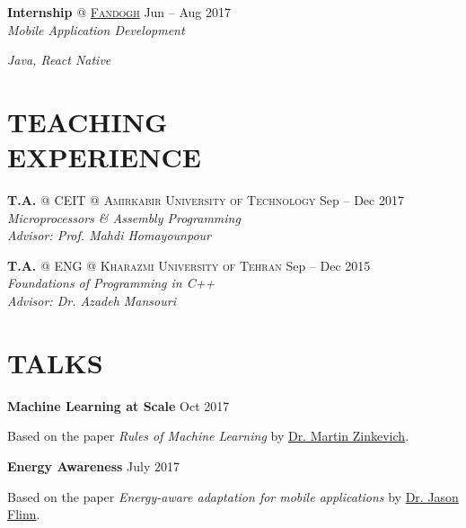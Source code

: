 \documentclass[margin, 10pt]{res} %
\begin{document}
\begin{resume}
	\textbf{Internship} \textsc{@}
	\href{http://www.fandogh.org/}{\textsc{Fandogh}}
	\hfill {Jun -- Aug 2017}\\
	\textit{Mobile Application Development}
	\begin{innerlist}
		\item \textit{Java, React Native}
	\end{innerlist}

  	\vspace{0.5cm}
    
    \section{TEACHING \\ EXPERIENCE} 
    
   \textbf{T.A.} \textsc{@}
   \textsc{CEIT} \textsc{@} \textsc{Amirkabir University of Technology}
   \hfill {Sep -- Dec 2017}\\
   \textit{Microprocessors \& Assembly Programming}\\
   \textit{Advisor: Prof. Mahdi Homayounpour}
   
   \textbf{T.A.} \textsc{@}
   \textsc{ENG} \textsc{@} \textsc{Kharazmi University of Tehran}
   \hfill {Sep -- Dec 2015}\\
   \textit{Foundations of Programming in C++}\\
   \textit{Advisor: Dr. Azadeh Mansouri}
      	\vspace{0.5cm}
	\section{TALKS} 
	\textbf{Machine Learning at Scale}
	\hfill {Oct 2017}
		\vspace{0.15cm}
	\begin{innerlist}
		\item Based on the paper \textit{Rules of Machine Learning} by \href{http://martin.zinkevich.org/rules_of_ml/rules_of_ml.pdf}{Dr. Martin Zinkevich}.
	\end{innerlist}

	\textbf{Energy Awareness}
	\hfill {July 2017}
		\vspace{0.15cm}
	\begin{innerlist}
		\item Based on the paper \textit{Energy-aware adaptation for mobile applications} by \href{http://www-cgi.cs.cmu.edu/afs/cs.cmu.edu/Web/People/odyssey/docdir/s17.pdf5}{Dr. Jason Flinn}.
	\end{innerlist}


\end{resume}
\end{document}

